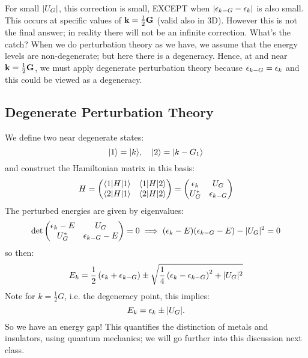 For small $\lvert U_G \rvert$, this correction is small, EXCEPT when $\lvert \epsilon_{k - G} - \epsilon_k \rvert$ is also small. This occurs at specific values of $\mathbf{k} = \frac{1}{2}\mathbf{G}$ (valid also in 3D). However this is not the final answer; in reality there will not be an infinite correction. What's the catch? When we do perturbation theory as we have, we assume that the energy levels are non-degenerate; but here there is a degeneracy. Hence, at and near $\mathbf{k} = \frac{1}{2}\mathbf{G}$, we must apply degenerate perturbation theory because $\epsilon_{k - G} = \epsilon_k$ and this could be viewed as a degeneracy.

\subsection{Degenerate Perturbation Theory}
We define two near degenerate states:
\begin{equation}
    \lvert 1 \rangle = \lvert k \rangle, \quad \lvert 2 \rangle = \lvert k - G_1 \rangle
\end{equation}
and construct the Hamiltonian matrix in this basis:
\begin{equation}
    H = \begin{pmatrix}\langle 1 \rvert H\lvert 1 \rangle & \langle 1 \rvert H\lvert 2 \rangle \\ \langle 2 \rvert H\lvert 1 \rangle & \langle 2 \rvert H\lvert 2 \rangle\end{pmatrix} = \begin{pmatrix}\epsilon_k & U_G \\ U_G^* & \epsilon_{k-G}\end{pmatrix}
\end{equation}
The perturbed energies are given by eigenvalues:
\begin{equation}
    \det\begin{pmatrix}\epsilon_k - E & U_G \\ U_G^* & \epsilon_{k-G} - E\end{pmatrix} = 0 \implies (\epsilon_k - E)(\epsilon_{k-G} - E) - \lvert U_G \rvert^2 = 0
\end{equation}
so then:
\begin{equation}
    E_k = \frac{1}{2}\left(\epsilon_k + \epsilon_{k-G}\right) \pm \sqrt{\frac{1}{4}\left(\epsilon_k - \epsilon_{k-G}\right)^2 + \lvert U_G \rvert^2}
\end{equation}
Note for $k = \frac{1}{2}G$, i.e. the degeneracy point, this implies:
\begin{equation}
    E_k = \epsilon_k \pm \lvert U_G \rvert.
\end{equation}
So we have an energy gap! This quantifies the distinction of metals and insulators, using quantum mechanics; we will go further into this discussion next class.